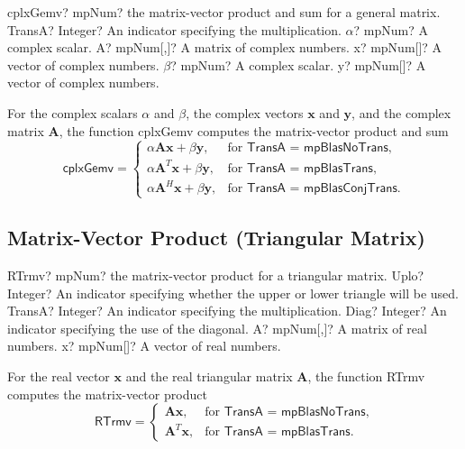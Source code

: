 \vspace{0.6cm}
\begin{mpFunctionsExtract}
	\mpFunctionSix
	{cplxGemv? mpNum? the matrix-vector product and sum for a general matrix.}
	{TransA? Integer? An indicator specifying the multiplication.}
	{$\alpha$? mpNum? A complex scalar.}
	{A? mpNum[,]? A matrix of complex numbers.}
	{x? mpNum[]? A vector of complex numbers.}
	{$\beta$? mpNum? A complex scalar.}
	{y? mpNum[]? A vector of complex numbers.}
\end{mpFunctionsExtract}


\vspace{0.3cm}
For the complex scalars $\alpha$ and $\beta$, the complex vectors $\boldsymbol{x}$ and $\boldsymbol{y}$, and the complex matrix $\boldsymbol{A}$, the function \textsf{cplxGemv} computes the matrix-vector product and sum 
\begin{equation}
\textsf{cplxGemv}=\begin{cases}
\alpha \boldsymbol{A} \boldsymbol{x} + \beta \boldsymbol{y}, & \text{for } \textsf{TransA = mpBlasNoTrans},\\
\alpha \boldsymbol{A}^T \boldsymbol{x} + \beta \boldsymbol{y}, & \text{for } \textsf{TransA = mpBlasTrans},\\
\alpha \boldsymbol{A}^H \boldsymbol{x} + \beta \boldsymbol{y}, & \text{for } \textsf{TransA = mpBlasConjTrans}.
\end{cases}
\end{equation}





\newpage
\subsection{Matrix-Vector Product (Triangular Matrix)}

\begin{mpFunctionsExtract}
	\mpFunctionFive
	{RTrmv? mpNum?  the matrix-vector product for a triangular matrix.}
	{Uplo? Integer? An indicator specifying whether the upper or lower triangle will be used.}
	{TransA? Integer? An indicator specifying the multiplication.}
	{Diag? Integer? An indicator specifying the use of the diagonal.}
	{A? mpNum[,]? A matrix of real numbers.}
	{x? mpNum[]? A vector of real numbers.}
\end{mpFunctionsExtract}

\vspace{0.3cm}
For the real vector $\boldsymbol{x}$ and the real triangular matrix $\boldsymbol{A}$, the function \textsf{RTrmv} computes the matrix-vector product
\begin{equation}
\textsf{RTrmv}=\begin{cases}
\boldsymbol{A} \boldsymbol{x}, & \text{for } \textsf{TransA = mpBlasNoTrans},\\
\boldsymbol{A}^T \boldsymbol{x}, & \text{for } \textsf{TransA = mpBlasTrans}.
\end{cases}
\end{equation}


